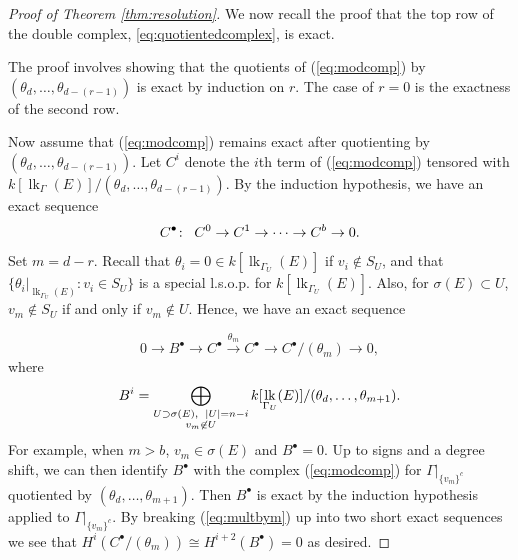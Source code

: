 \documentclass[ALCO, Unicode,published]{cedram}
\DeclareMathOperator{\lk}{lk}
\begin{document}
\begin{proof}[Proof of Theorem \ref{thm:resolution}]
We now recall the proof that the top row of the double complex, \eqref{eq:quotientedcomplex}, is exact.
\begin{center}
\end{center}
The proof involves showing that the quotients of (\ref{eq:modcomp}) by $(\theta_{d}, \dotsc, \theta_{d - (r-1)})$ is exact by induction on $r$. The case of $r = 0$ is the exactness of the second row. 

Now assume that (\ref{eq:modcomp}) remains exact after quotienting by $(\theta_{d}, \dotsc, \theta_{d - (r-1)})$. Let $C^i$ denote the $i$th term of (\ref{eq:modcomp}) tensored with $k[\lk_{\Gamma}(E)]/(\theta_{d}, \dotsc, \theta_{d - (r - 1)})$. By the induction hypothesis, we have an exact sequence
\begin{equation*}
C^{\bullet}\colon \enskip  C^0 \to C^1 \to \dotsb \to C^{b} \to 0.
\end{equation*} 
Set $m = d - r$. Recall that 
$\theta_i = 0 \in k[\lk_{\Gamma_{U}}(E)]$ if $v_i \notin S_U$, and that $\{ \theta_i|_{\lk_{\Gamma_U}(E)} : v_i \in S_U \}$ is a special l.s.o.p. for $k[\lk_{\Gamma_{U}}(E)]$. 
Also, for $\sigma(E) \subset U$, $v_m \notin S_U$ if and only if $v_m \notin U$. Hence, we have an exact sequence

\begin{equation} \label{eq:multbym}
0 \to B^{\bullet} \to C^{\bullet} \xrightarrow{\theta_{m}} C^{\bullet} \to C^{\bullet}/(\theta_{m}) \to 0,
\end{equation}
where 
\[
B^{i} = \bigoplus_{\substack{U \supset \sigma(E), \enskip \vert U \vert = n-i \\ v_m \not \in U}}k[\lk_{\Gamma_U}(E)]/(\theta_{d}, \dotsc, \theta_{m + 1}).
\]
For example, when $m > b$, $v_m \in \sigma(E)$ and $B^{\bullet} = 0$.
Up to signs and a degree shift, we can then identify $ B^{\bullet}$ with the complex (\ref{eq:modcomp}) for $\Gamma|_{\{v_m\}^c}$ quotiented by $(\theta_{d}, \dotsc, \theta_{m + 1})$. Then $ B^{\bullet}$ is exact by the induction hypothesis applied to $\Gamma|_{\{v_m\}^c}$. By breaking (\ref{eq:multbym}) up into two short exact sequences we see that $H^i(C^{\bullet}/(\theta_{m})) \cong H^{i + 2}(B^{\bullet}) = 0$ as desired.


\end{proof}
\end{document}
